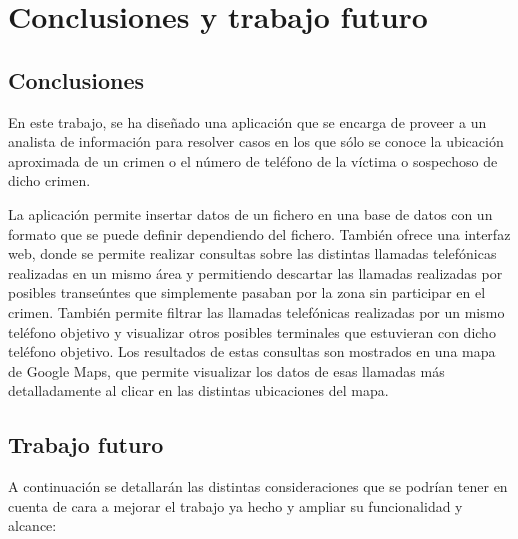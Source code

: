 \chapter{Conclusiones y trabajo futuro\label{CAP:CONCTRAB}}
  \section{Conclusiones\label{SEC:CONCLUSIONES}}
    En este trabajo, se ha diseñado una aplicación que se encarga de proveer a un analista de información para resolver casos en los que sólo se conoce la ubicación aproximada de un crimen o el número de teléfono de la víctima o sospechoso de dicho crimen.
    
    La aplicación permite insertar datos de un fichero en una base de datos con un formato que se puede definir dependiendo del fichero.
    También ofrece una interfaz web, donde se permite realizar consultas sobre las distintas llamadas telefónicas realizadas en un mismo área y permitiendo descartar las llamadas realizadas por posibles transeúntes que simplemente pasaban por la zona sin participar en el crimen.
    También permite filtrar las llamadas telefónicas realizadas por un mismo teléfono objetivo y visualizar otros posibles terminales que estuvieran con dicho teléfono objetivo.
    Los resultados de estas consultas son mostrados en una mapa de Google Maps, que permite visualizar los datos de esas llamadas más detalladamente al clicar en las distintas ubicaciones del mapa.
    
  \section{Trabajo futuro\label{SEC:TRABAJO}}
    A continuación se detallarán las distintas consideraciones que se podrían tener en cuenta de cara a mejorar el trabajo ya hecho y ampliar su funcionalidad y alcance:
    
